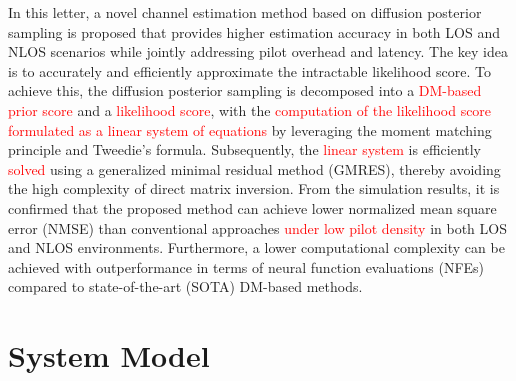 \documentclass[lettersize,journal]{IEEEtran}
\newcommand{\tred}{\textcolor{red}}
\begin{document}
In this letter, a novel channel estimation method based on diffusion posterior sampling is proposed that provides higher estimation accuracy in both LOS and NLOS scenarios while jointly addressing pilot overhead and latency. The key idea is to accurately and efficiently approximate the intractable likelihood score. To achieve this, the diffusion posterior sampling is decomposed into a \tred{DM-based prior score} and a \tred{likelihood score}, with the \tred{computation of the likelihood score formulated as a linear system of equations} by leveraging the moment matching principle and Tweedie's formula. Subsequently, the \tred{linear system} is efficiently \tred{solved} using a generalized minimal residual method (GMRES), thereby avoiding the high complexity of direct matrix inversion. From the simulation results, it is confirmed that the proposed method can achieve lower normalized mean square error (NMSE) than conventional approaches \tred{under low pilot density} in both LOS and NLOS environments. Furthermore, a lower computational complexity can be achieved with outperformance in terms of neural function evaluations (NFEs) compared to state-of-the-art (SOTA) DM-based methods.

\section{System Model}
\end{document}
